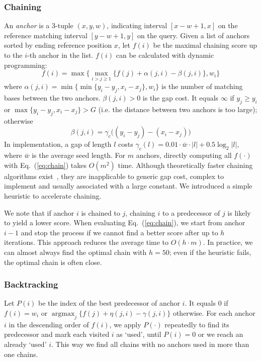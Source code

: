 \documentclass{bioinfo}
\DeclareMathOperator*{\argmax}{argmax}
\begin{document}
\begin{methods}
\subsubsection{Chaining}
An \emph{anchor} is a 3-tuple $(x,y,w)$, indicating interval $[x-w+1,x]$ on the
reference matching interval $[y-w+1,y]$ on the query. Given a list of anchors
sorted by ending reference position $x$, let $f(i)$ be the maximal chaining
score up to the $i$-th anchor in the list. $f(i)$ can be calculated with
dynamic programming:
\begin{equation}\label{eq:chain}
f(i)=\max\big\{\max_{i>j\ge 1} \{ f(j)+\alpha(j,i)-\beta(j,i) \},w_i\big\}
\end{equation}
where $\alpha(j,i)=\min\big\{\min\{y_i-y_j,x_i-x_j\},w_i\big\}$ is the number of
matching bases between the two anchors. $\beta(j,i)>0$ is the gap cost. It
equals $\infty$ if $y_j\ge y_i$ or $\max\{y_i-y_j,x_i-x_j\}>G$ (i.e. the
distance between two anchors is too large); otherwise
\begin{equation}\label{eq:chain-gap}
\beta(j,i)=\gamma_c\big((y_i-y_j)-(x_i-x_j)\big)
\end{equation}
In implementation, a gap of length $l$ costs $\gamma_c(l)=0.01\cdot \bar{w}\cdot
|l|+0.5\log_2|l|$, where $\bar{w}$ is the average seed length. For $m$ anchors, directly computing all $f(\cdot)$ with
Eq.~(\ref{eq:chain}) takes $O(m^2)$ time. Although theoretically faster
chaining algorithms exist~\citep{Abouelhoda:2005aa}, they
are inapplicable to generic gap cost, complex to implement and usually
associated with a large constant. We introduced a simple heuristic to
accelerate chaining.

We note that if anchor $i$ is chained to $j$, chaining $i$ to a predecessor
of $j$ is likely to yield a lower score. When evaluating Eq.~(\ref{eq:chain}),
we start from anchor $i-1$ and stop the process if we cannot find a better
score after up to $h$ iterations. This approach reduces the average time to
$O(h\cdot m)$. In practice, we can almost always find the optimal chain with
$h=50$; even if the heuristic fails, the optimal chain is often close.

\subsubsection{Backtracking}
Let $P(i)$ be the index of the best predecessor of anchor $i$. It equals 0 if
$f(i)=w_i$ or $\argmax_j\{f(j)+\eta(j,i)-\gamma(j,i)\}$ otherwise. For each
anchor $i$ in the descending order of $f(i)$, we apply $P(\cdot)$ repeatedly to
find its predecessor and mark each visited $i$ as `used', until $P(i)=0$ or we
reach an already `used' $i$. This way we find all chains with no anchors used
in more than one chains.


\end{methods}
\end{document}
